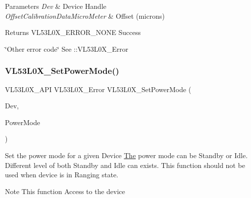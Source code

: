 \begin{DoxyParams}{Parameters}
{\em Dev} & Device Handle \\
\hline
{\em Offset\+Calibration\+Data\+Micro\+Meter} & Offset (microns) \\
\hline
\end{DoxyParams}
\begin{DoxyReturn}{Returns}
V\+L53\+L0\+X\+\_\+\+E\+R\+R\+O\+R\+\_\+\+N\+O\+NE Success 

\char`\"{}\+Other error code\char`\"{} See \+::\+V\+L53\+L0\+X\+\_\+\+Error 
\end{DoxyReturn}
\mbox{\label{group__VL53L0X__general__group_ga8b435ab0813267fca1546c7da732c1f2}} 
\subsubsection{\texorpdfstring{V\+L53\+L0\+X\+\_\+\+Set\+Power\+Mode()}{VL53L0X\_SetPowerMode()}}
{\footnotesize\ttfamily V\+L53\+L0\+X\+\_\+\+A\+PI V\+L53\+L0\+X\+\_\+\+Error V\+L53\+L0\+X\+\_\+\+Set\+Power\+Mode (\begin{DoxyParamCaption}\item[{\hyperlink{group__VL53L0X__platform__group_ga2d6405308b1dd524b462f1b8fb97d167}{V\+L53\+L0\+X\+\_\+\+D\+EV}}]{Dev,  }\item[{V\+L53\+L0\+X\+\_\+\+Power\+Modes}]{Power\+Mode }\end{DoxyParamCaption})}



Set the power mode for a given Device \hyperlink{structThe}{The} power mode can be Standby or Idle. Different level of both Standby and Idle can exists. This function should not be used when device is in Ranging state. 

\begin{DoxyNote}{Note}
This function Access to the device
\end{DoxyNote}

